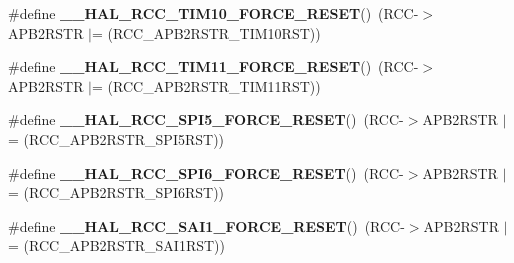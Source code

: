 \begin{DoxyCompactItemize}
\item 
\mbox{\label{group___r_c_c_ex___force___release___peripheral___reset_gaa40d4e3fd1261bb0cd239575a433e8e8}} 
\#define {\bfseries \+\_\+\+\_\+\+H\+A\+L\+\_\+\+R\+C\+C\+\_\+\+T\+I\+M10\+\_\+\+F\+O\+R\+C\+E\+\_\+\+R\+E\+S\+ET}()~(R\+CC-\/$>$A\+P\+B2\+R\+S\+TR $\vert$= (R\+C\+C\+\_\+\+A\+P\+B2\+R\+S\+T\+R\+\_\+\+T\+I\+M10\+R\+ST))
\item 
\mbox{\label{group___r_c_c_ex___force___release___peripheral___reset_gaeaf6b459cfeb85e2e098b78825e476f2}} 
\#define {\bfseries \+\_\+\+\_\+\+H\+A\+L\+\_\+\+R\+C\+C\+\_\+\+T\+I\+M11\+\_\+\+F\+O\+R\+C\+E\+\_\+\+R\+E\+S\+ET}()~(R\+CC-\/$>$A\+P\+B2\+R\+S\+TR $\vert$= (R\+C\+C\+\_\+\+A\+P\+B2\+R\+S\+T\+R\+\_\+\+T\+I\+M11\+R\+ST))
\item 
\mbox{\label{group___r_c_c_ex___force___release___peripheral___reset_gac704a83b1296914d004b6c915758eaeb}} 
\#define {\bfseries \+\_\+\+\_\+\+H\+A\+L\+\_\+\+R\+C\+C\+\_\+\+S\+P\+I5\+\_\+\+F\+O\+R\+C\+E\+\_\+\+R\+E\+S\+ET}()~(R\+CC-\/$>$A\+P\+B2\+R\+S\+TR $\vert$= (R\+C\+C\+\_\+\+A\+P\+B2\+R\+S\+T\+R\+\_\+\+S\+P\+I5\+R\+ST))
\item 
\mbox{\label{group___r_c_c_ex___force___release___peripheral___reset_ga3c63279f892ce515d74ee8facfee1345}} 
\#define {\bfseries \+\_\+\+\_\+\+H\+A\+L\+\_\+\+R\+C\+C\+\_\+\+S\+P\+I6\+\_\+\+F\+O\+R\+C\+E\+\_\+\+R\+E\+S\+ET}()~(R\+CC-\/$>$A\+P\+B2\+R\+S\+TR $\vert$= (R\+C\+C\+\_\+\+A\+P\+B2\+R\+S\+T\+R\+\_\+\+S\+P\+I6\+R\+ST))
\item 
\mbox{\label{group___r_c_c_ex___force___release___peripheral___reset_ga08adabe36014364464e61606606e184d}} 
\#define {\bfseries \+\_\+\+\_\+\+H\+A\+L\+\_\+\+R\+C\+C\+\_\+\+S\+A\+I1\+\_\+\+F\+O\+R\+C\+E\+\_\+\+R\+E\+S\+ET}()~(R\+CC-\/$>$A\+P\+B2\+R\+S\+TR $\vert$= (R\+C\+C\+\_\+\+A\+P\+B2\+R\+S\+T\+R\+\_\+\+S\+A\+I1\+R\+ST))
\item 
\mbox{\label{group___r_c_c_ex___force___release___peripheral___reset_gae126c8da64cf14a57e439731fe8393b2}} 

\end{DoxyCompactItemize}
